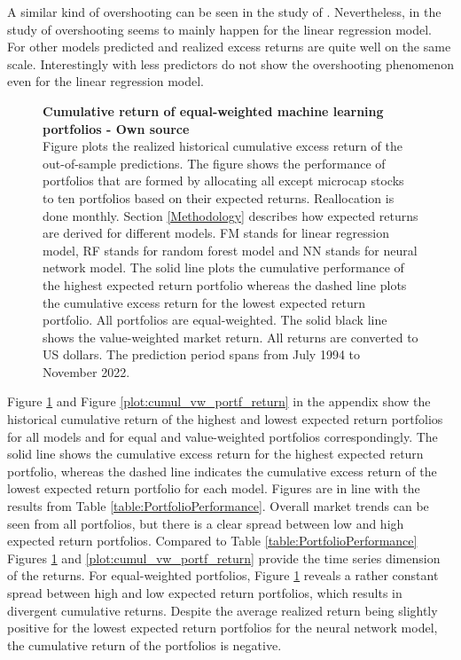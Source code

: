 \documentclass[12pt]{article}
\begin{document}
A similar kind of overshooting can be seen in the study of \citet{Drobetz}. Nevertheless, in the study of \citeauthor{Drobetz} overshooting seems to mainly happen for the linear regression model.\footnotemark {} For other models predicted and realized excess returns are quite well on the same scale. Interestingly with less predictors \citet{Fieberg} do not show the overshooting phenomenon even for the linear regression model.\footnotemark {} \par

\begin{figure}[ht]
\centering
\caption[Cumulative return of equal-weighted machine learning portfolios]{\textbf{Cumulative return of equal-weighted machine learning portfolios \textnormal{- Own source}}\\ Figure plots the realized historical cumulative excess return of the out-of-sample predictions. The figure shows the performance of portfolios that are formed by allocating all except microcap stocks to ten portfolios based on their expected returns. Reallocation is done monthly. Section \ref{Methodology} describes how expected returns are derived for different models. FM stands for linear regression model, RF stands for random forest model and NN stands for neural network model. The solid line plots the cumulative performance of the highest expected return portfolio whereas the dashed line plots the cumulative excess return for the lowest expected return portfolio. All portfolios are equal-weighted. The solid black line shows the value-weighted market return. All returns are converted to US dollars. The prediction period spans from July 1994 to November 2022.}

\label{plot:cumul_ew_portf_return}
\end{figure}

Figure \ref{plot:cumul_ew_portf_return} and Figure \ref{plot:cumul_vw_portf_return} in the appendix show the historical cumulative return of the highest and lowest expected return portfolios for all models and for equal and value-weighted portfolios correspondingly. The solid line shows the cumulative excess return for the highest expected return portfolio, whereas the dashed line indicates the cumulative excess return of the lowest expected return portfolio for each model. Figures are in line with the results from Table \ref{table:PortfolioPerformance}. Overall market trends can be seen from all portfolios, but there is a clear spread between low and high expected return portfolios. Compared to Table \ref{table:PortfolioPerformance} Figures \ref{plot:cumul_ew_portf_return} and \ref{plot:cumul_vw_portf_return} provide the time series dimension of the returns. For equal-weighted portfolios, Figure \ref{plot:cumul_ew_portf_return} reveals a rather constant spread between high and low expected return portfolios, which results in divergent cumulative returns. Despite the average realized return being slightly positive for the lowest expected return portfolios for the neural network model, the cumulative return of the portfolios is negative. \par
\end{document}
